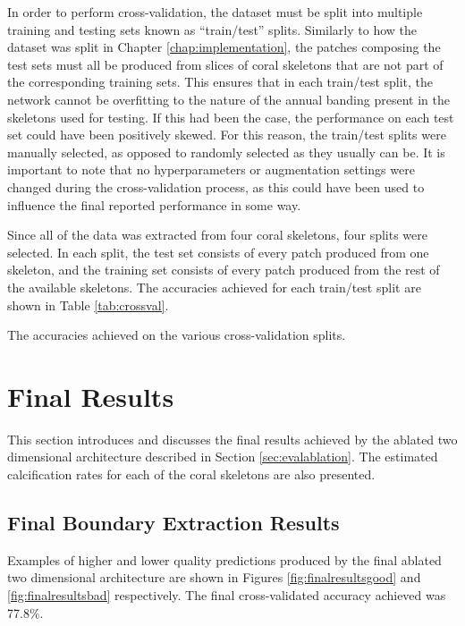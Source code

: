 In order to perform cross-validation, the dataset must be split into multiple training and testing sets known as ``train/test'' splits. Similarly to how the dataset was split in Chapter \ref{chap:implementation}, the patches composing the test sets must all be produced from slices of coral skeletons that are not part of the corresponding training sets. This ensures that in each train/test split, the network cannot be overfitting to the nature of the annual banding present in the skeletons used for testing. If this had been the case, the performance on each test set could have been positively skewed. For this reason, the train/test splits were manually selected, as opposed to randomly selected as they usually can be. It is important to note that no hyperparameters or augmentation settings were changed during the cross-validation process, as this could have been used to influence the final reported performance in some way.

Since all of the data was extracted from four coral skeletons, four splits were selected. In each split, the test set consists of every patch produced from one skeleton, and the training set consists of every patch produced from the rest of the available skeletons. The accuracies achieved for each train/test split are shown in Table \ref{tab:crossval}.

\begin{table}[!t]
    \centering
    \caption{The accuracies achieved on the various cross-validation splits.}
    
    \label{tab:crossval}
\end{table}

\section{Final Results}
\label{sec:finalresults}

This section introduces and discusses the final results achieved by the ablated two dimensional architecture described in Section \ref{sec:evalablation}. The estimated calcification rates for each of the coral skeletons are also presented.

\subsection{Final Boundary Extraction Results}

Examples of higher and lower quality predictions produced by the final ablated two dimensional architecture are shown in Figures \ref{fig:finalresultsgood} and \ref{fig:finalresultsbad} respectively. The final cross-validated accuracy achieved was 77.8\%.

